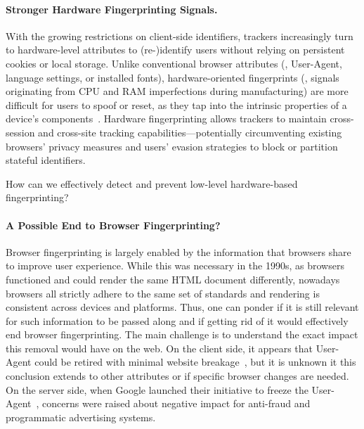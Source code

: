 \paragraph{Stronger Hardware Fingerprinting Signals.}
With the growing restrictions on client-side identifiers, trackers increasingly turn to hardware-level attributes to (re-)identify users without relying on persistent cookies or local storage.
%
Unlike conventional browser attributes (\eg{}, User-Agent, language settings, or installed fonts), hardware-oriented fingerprints (\eg{}, signals originating from CPU and RAM imperfections during manufacturing) are more difficult for users to spoof or reset, as they tap into the intrinsic properties of a device’s components~\cite{venugopalanFPRowhammerDRAMBasedDevice2024}.
%
Hardware fingerprinting allows trackers to maintain cross-session and cross-site tracking capabilities---potentially circumventing existing browsers' privacy measures and users' evasion strategies to block or partition stateful identifiers.

\begin{opbox}
How can we effectively detect and prevent low-level hardware-based fingerprinting?
\end{opbox}
\vspace{-3mm}

\paragraph{A Possible End to Browser Fingerprinting?}
Browser fingerprinting is largely enabled by the information that browsers share to improve user experience. While this was necessary in the 1990s, as browsers functioned and could render the same HTML document differently, nowadays browsers all strictly adhere to the same set of standards and rendering is consistent across devices and platforms. Thus, one can ponder if it is still relevant for such information to be passed along and if getting rid of it would effectively end browser fingerprinting.
%
The main challenge is to understand the exact impact this removal would have on the web. On the client side, it appears that User-Agent could be retired with minimal website breakage~\cite{intumwayaseUARadarExploringImpact2023}, but it is unknown it this conclusion extends to other attributes or if specific browser changes are needed. On the server side, when Google launched their initiative to freeze the User-Agent~\cite{weissIntentDeprecateFreeze2020}, concerns were raised about negative impact for anti-fraud and programmatic advertising systems.

